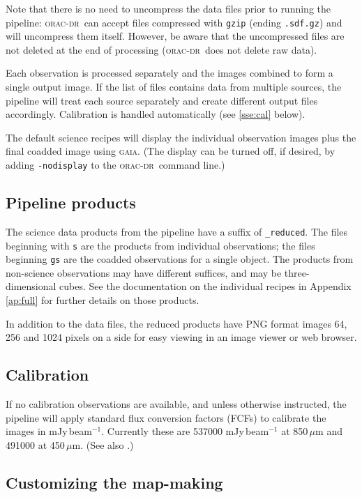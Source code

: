 \documentclass[twoside,11pt]{article}
\renewcommand{\_}{\texttt{\symbol{95}}}
\newcommand{\GAIA}{\textsc{gaia}}
\newcommand{\oracdr}{\textsc{orac-dr}}
\begin{document}
Note that there is no need to uncompress the data files prior to
running the pipeline: \oracdr\ can accept files compressed with
\verb+gzip+ (ending \verb+.sdf.gz+) and will uncompress them
itself. However, be aware that the uncompressed files are not deleted
at the end of processing (\oracdr\ does not delete raw data).

Each observation is processed separately and the images combined to
form a single output image. If the list of files contains data from
multiple sources, the pipeline will treat each source separately and
create different output files accordingly. Calibration is handled
automatically (see \ref{sse:cal} below).

The default science recipes will display the individual observation
images plus the final coadded image using \GAIA. (The display can be
turned off, if desired, by adding \texttt{-nodisplay} to the
\oracdr\ command line.)

\subsection{Pipeline products}

The science data products from the pipeline have a suffix of
\verb+_reduced+. The files beginning with \verb+s+ are the products
from individual observations; the files beginning \verb+gs+ are the
coadded observations for a single object. The products from
non-science observations may have different suffices, and may be
three-dimensional cubes. See the documentation on the individual
recipes in Appendix\,\ref{ap:full} for further details on those
products.

In addition to the data files, the reduced products have PNG format
images 64, 256 and 1024 pixels on a side for easy viewing in an image
viewer or web browser.

\subsection{Calibration\label{sse:cal}}

If no calibration observations are available, and unless otherwise
instructed, the pipeline will apply standard flux conversion factors
(FCFs) to calibrate the images in mJy\,beam$^{-1}$. Currently these
are 537000 mJy\,beam$^{-1}$ at 850\,$\mu$m and 491000 at
450\,$\mu$m. (See also \cite{scuba2calpaper}.)

\subsection{Customizing the map-making}
\end{document}
